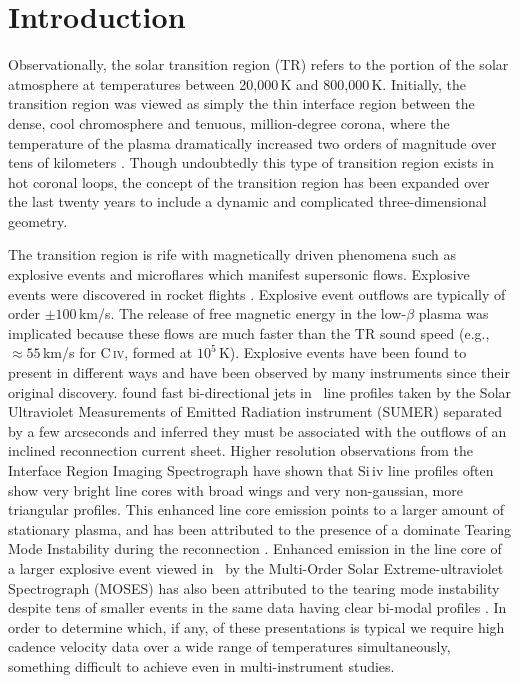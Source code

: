 




\section{Introduction}

    Observationally, the solar transition region (TR) refers to the portion of the solar atmosphere at temperatures between 20,000\,K and 800,000\,K. 
    Initially, the transition region was viewed as simply the thin interface region between the dense, cool chromosphere and tenuous, million-degree corona, where the temperature of the plasma dramatically increased two orders of magnitude over tens of kilometers \citep[see][and references therein]{tian2017}. 
    Though undoubtedly this type of transition region exists in hot coronal loops, the concept of the transition region has been expanded over the last twenty years to include a dynamic and complicated three-dimensional geometry. 
    
    The transition region is rife with magnetically driven phenomena such as explosive events \cite[e.g.,][]{dere1991} and microflares \citep{gontikakis2012} which manifest supersonic flows.
    Explosive events were discovered in rocket flights \citep{Dere1989}. 
    Explosive event outflows are typically of order $\pm 100$\,km/s. 
    The release of free magnetic energy in the low-$\beta$ plasma was implicated because these flows are much faster than the TR sound speed (e.g., $\approx55$\,km/s  for C\,\textsc{iv}, formed at $10^5$\,K).
    Explosive events have been found to present in different ways and have been observed by many instruments since their original discovery.
    \citet{innes1997} found fast bi-directional jets in \siiv \ line profiles taken by the Solar Ultraviolet Measurements of Emitted Radiation instrument (SUMER)  \citep{SUMER} separated by a few arcseconds and inferred they must be associated with the outflows of an inclined reconnection current sheet.
    Higher resolution observations from the Interface Region Imaging Spectrograph \citep[IRIS]{IRIS} have shown that Si\,{\sc iv} line profiles often show very bright line cores with broad wings and very non-gaussian, more triangular profiles.
    This enhanced line core emission points to a larger amount of stationary plasma, and has been attributed to the presence of a dominate Tearing Mode Instability during the reconnection \citep{Innes2015}.
    Enhanced emission in the line core of a larger explosive event viewed in \heii \ by the Multi-Order Solar Extreme-ultraviolet Spectrograph (MOSES)  has also been attributed to the tearing mode instability \citep{Fox2010} despite tens of smaller events in the same data having clear bi-modal profiles \citep{Rust2019}.
    In order to determine which, if any, of these presentations is typical we require high cadence velocity data over a wide range of temperatures simultaneously, something difficult to achieve even in multi-instrument studies.
    
